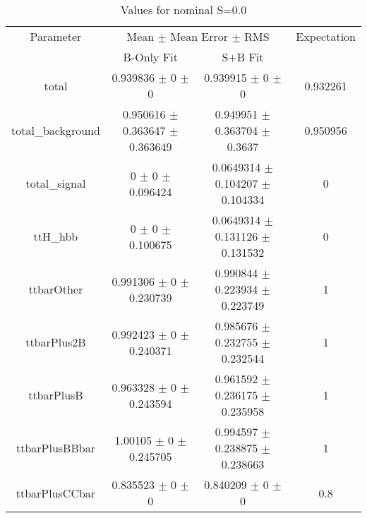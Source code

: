 \begin{table}
\centering
\caption{Values for nominal S=0.0}
\begin{tabular}{cccc}
\toprule
Parameter & \multicolumn{2}{c}{Mean $\pm$ Mean Error $\pm$ RMS} & Expectation\\
 & B-Only Fit & S+B Fit & \\
\midrule
total & \num{0.939836} $\pm$ \num{0} $\pm$ \num{0} & \num{0.939915} $\pm$ \num{0} $\pm$ \num{0} & \num{0.932261}\\
total\_background & \num{0.950616} $\pm$ \num{0.363647} $\pm$ \num{0.363649} & \num{0.949951} $\pm$ \num{0.363704} $\pm$ \num{0.3637} & \num{0.950956}\\
total\_signal & \num{0} $\pm$ \num{0} $\pm$ \num{0.096424} & \num{0.0649314} $\pm$ \num{0.104207} $\pm$ \num{0.104334} & \num{0}\\
ttH\_hbb & \num{0} $\pm$ \num{0} $\pm$ \num{0.100675} & \num{0.0649314} $\pm$ \num{0.131126} $\pm$ \num{0.131532} & \num{0}\\
ttbarOther & \num{0.991306} $\pm$ \num{0} $\pm$ \num{0.230739} & \num{0.990844} $\pm$ \num{0.223934} $\pm$ \num{0.223749} & \num{1}\\
ttbarPlus2B & \num{0.992423} $\pm$ \num{0} $\pm$ \num{0.240371} & \num{0.985676} $\pm$ \num{0.232755} $\pm$ \num{0.232544} & \num{1}\\
ttbarPlusB & \num{0.963328} $\pm$ \num{0} $\pm$ \num{0.243594} & \num{0.961592} $\pm$ \num{0.236175} $\pm$ \num{0.235958} & \num{1}\\
ttbarPlusBBbar & \num{1.00105} $\pm$ \num{0} $\pm$ \num{0.245705} & \num{0.994597} $\pm$ \num{0.238875} $\pm$ \num{0.238663} & \num{1}\\
ttbarPlusCCbar & \num{0.835523} $\pm$ \num{0} $\pm$ \num{0} & \num{0.840209} $\pm$ \num{0} $\pm$ \num{0} & \num{0.8}\\
\bottomrule
\end{tabular}
\end{table}
